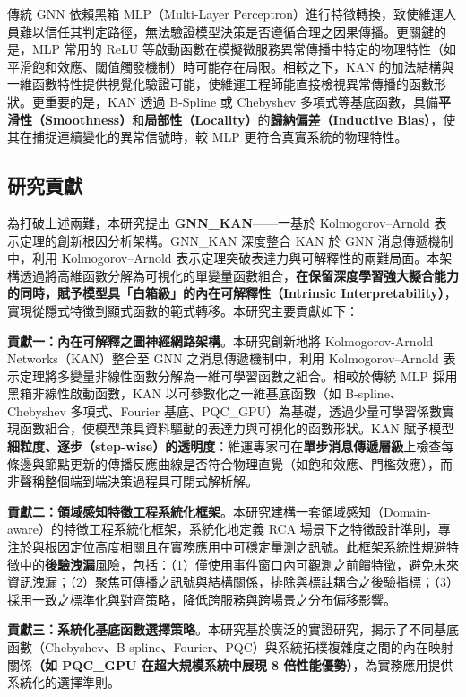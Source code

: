 \documentclass[10pt,a4paper,twocolumn]{article}
\begin{document}
傳統 GNN 依賴黑箱 MLP（Multi-Layer Perceptron）進行特徵轉換，致使維運人員難以信任其判定路徑，無法驗證模型決策是否遵循合理之因果傳播。更關鍵的是，MLP 常用的 ReLU 等啟動函數在模擬微服務異常傳播中特定的物理特性（如平滑飽和效應、閾值觸發機制）時可能存在局限。相較之下，KAN 的加法結構與一維函數特性提供視覺化驗證可能，使維運工程師能直接檢視異常傳播的函數形狀。更重要的是，KAN 透過 B-Spline 或 Chebyshev 多項式等基底函數，具備\textbf{平滑性（Smoothness）}和\textbf{局部性（Locality）}的\textbf{歸納偏差（Inductive Bias）}，使其在捕捉連續變化的異常信號時，較 MLP 更符合真實系統的物理特性。

\subsection{研究貢獻}

為打破上述兩難，本研究提出 \textbf{GNN\_KAN}——一基於 Kolmogorov–Arnold 表示定理的創新根因分析架構。GNN\_KAN 深度整合 KAN 於 GNN 消息傳遞機制中，利用 Kolmogorov–Arnold 表示定理突破表達力與可解釋性的兩難局面。本架構透過將高維函數分解為可視化的單變量函數組合，\textbf{在保留深度學習強大擬合能力的同時，賦予模型具「白箱級」的內在可解釋性（Intrinsic Interpretability）}，實現從隱式特徵到顯式函數的範式轉移。本研究主要貢獻如下：

\textbf{貢獻一：內在可解釋之圖神經網路架構}。本研究創新地將 Kolmogorov-Arnold Networks（KAN）整合至 GNN 之消息傳遞機制中，利用 Kolmogorov–Arnold 表示定理將多變量非線性函數分解為一維可學習函數之組合。相較於傳統 MLP 採用黑箱非線性啟動函數，KAN 以可參數化之一維基底函數（如 B-spline、Chebyshev 多項式、Fourier 基底、PQC\_GPU）為基礎，透過少量可學習係數實現函數組合，使模型兼具資料驅動的表達力與可視化的函數形狀。KAN 賦予模型\textbf{細粒度、逐步（step-wise）的透明度}：維運專家可在\textbf{單步消息傳遞層級}上檢查每條邊與節點更新的傳播反應曲線是否符合物理直覺（如飽和效應、門檻效應），而非聲稱整個端到端決策過程具可閉式解析解。

\textbf{貢獻二：領域感知特徵工程系統化框架}。本研究建構一套領域感知（Domain-aware）的特徵工程系統化框架，系統化地定義 RCA 場景下之特徵設計準則，專注於與根因定位高度相關且在實務應用中可穩定量測之訊號。此框架系統性規避特徵中的\textbf{後驗洩漏}風險，包括：（1）僅使用事件窗口內可觀測之前饋特徵，避免未來資訊洩漏；（2）聚焦可傳播之訊號與結構關係，排除與標註耦合之後驗指標；（3）採用一致之標準化與對齊策略，降低跨服務與跨場景之分布偏移影響。

\textbf{貢獻三：系統化基底函數選擇策略}。本研究基於廣泛的實證研究，揭示了不同基底函數（Chebyshev、B-spline、Fourier、PQC）與系統拓樸複雜度之間的內在映射關係\textbf{（如 PQC\_GPU 在超大規模系統中展現 8 倍性能優勢）}，為實務應用提供系統化的選擇準則。
\end{document}
